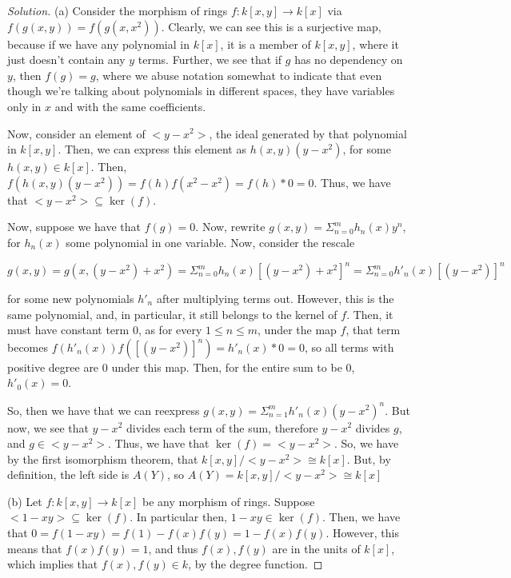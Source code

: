\documentclass[10pt]{article}
\begin{document}
\begin{proof}[Solution]

(a) Consider the morphism of rings $f: k[x,y] \rightarrow k[x]$ via $f(g(x,y)) = f(g(x,x^2))$. Clearly, we can see this is a surjective map, because if we have any polynomial in $k[x]$, it is a member of $k[x,y]$, where it just doesn't contain any $y$ terms. Further, we see that if $g$ has no dependency on $y$, then $f(g) = g$, where we abuse notation somewhat to indicate that even though we're talking about polynomials in different spaces, they have variables only in $x$ and with the same coefficients.

Now, consider an element of $<y-x^2>$, the ideal generated by that polynomial in $k[x,y]$. Then, we can express this element as $h(x,y)(y-x^2)$, for some $h(x,y) \in k[x]$. Then, $f(h(x,y)(y-x^2)) = f(h)f(x^2-x^2) = f(h)*0 = 0$. Thus, we have that $<y - x^2> \subseteq \ker(f)$.

Now, suppose we have that $f(g) = 0$. Now, rewrite $g(x,y) = \Sigma_{n=0}^m h_n(x) y^n$, for $h_n(x)$ some polynomial in one variable. Now, consider the rescale 

$$ g(x,y) = g(x,(y-x^2) + x^2) = \Sigma_{n=0}^m h_n(x)[(y-x^2) + x^2]^n =  \Sigma_{n=0}^m h'_n(x)[(y-x^2)]^n$$

for some new polynomials $h'_n$ after multiplying terms out. However, this is the same polynomial, and, in particular, it still belongs to the kernel of $f$. Then, it must have constant term $0$, as for every $1 \leq n \leq m$, under the map $f$, that term becomes $f(h'_n(x))f([(y-x^2)]^n) = h'_n(x) * 0 = 0$, so all terms with positive degree are 0 under this map. Then, for the entire sum to be $0$, $h'_0(x) = 0$.

So, then we have that we can reexpress $g(x,y) = \Sigma_{n=1}^m h'_n(x)(y-x^2)^n$. But now, we see that $y-x^2$ divides each term of the sum, therefore $y-x^2$ divides $g$, and $g \in <y-x^2>$. Thus, we have that $\ker(f) = <y-x^2>$. So, we have by the first isomorphism theorem, that $k[x,y]/<y-x^2> \cong k[x]$. But, by definition, the left side is $A(Y)$, so $A(Y) = k[x,y]/<y-x^2> \cong k[x]$

(b) Let $f: k[x,y] \rightarrow k[x]$ be any morphism of rings. Suppose $<1 - xy> \subseteq \ker(f)$. In particular then, $1 - xy \in \ker(f)$. Then, we have that $0 = f(1-xy) = f(1) - f(x)f(y) = 1 - f(x)f(y)$. However, this means that $f(x)f(y) = 1$, and thus $f(x),f(y)$ are in the units of $k[x]$, which implies that $f(x),f(y) \in k$, by the degree function.


\end{proof}
\end{document}
